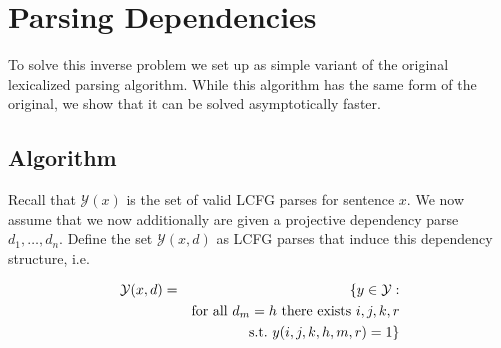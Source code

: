 \documentclass[11pt,letterpaper]{article}
\begin{document}
















\section{Parsing Dependencies}

To solve this inverse problem we set up as
simple variant of the original lexicalized parsing algorithm. While this algorithm has the same form of the original, we show that it can be solved asymptotically faster.

\subsection{Algorithm}

Recall that $\mathcal{Y}(x)$ is the set of valid LCFG parses for sentence $x$. We now assume that we now additionally are given a projective dependency parse $d_1, \ldots, d_n$. Define the set $\mathcal{Y}(x,d)$ as LCFG parses that induce this dependency structure, i.e.

\begin{eqnarray*}
  {\cal Y}(x,d ) & =& \{ y \in {\cal Y}: \\
&&\mathrm{for\ all\ } d_m =  h \mathrm{ \ there\ exists\ } i, j, k, r \\
&&\mathrm{s.t. \ }  y (i, j, k, h, m, r) = 1   \}
\end{eqnarray*}
\end{document}
